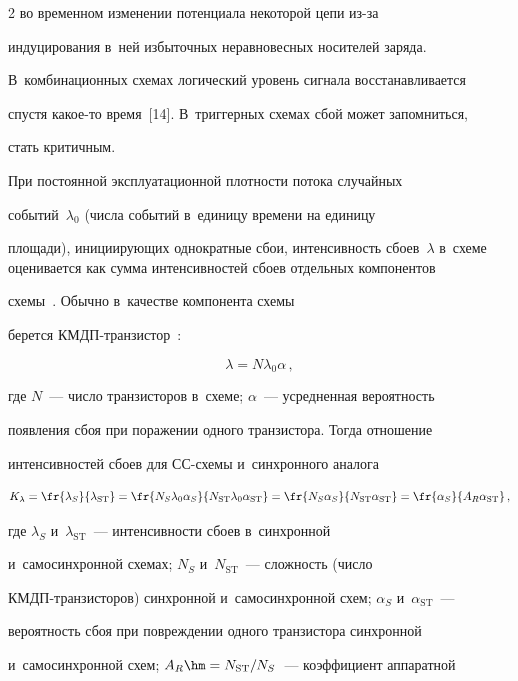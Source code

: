 \begin{multicols}{2}
во временном изменении потенциала некоторой цепи из-за 

индуцирования в~ней избыточных неравновесных носителей заряда. 

В~комбинационных схемах логический уровень сигнала восстанавливается 

спустя ка\-кое-то время~[14]. В~триггерных схемах сбой может запомниться, 

стать критичным. 

  

  При постоянной эксплуатационной плотности потока случайных 

событий~$\lambda_0$ (числа событий в~единицу времени на единицу 

площади), инициирующих однократные сбои, интенсивность сбоев~$\lambda$ в~схеме оценивается как сумма интенсивностей сбоев отдельных компонентов 

схемы~\cite[формула~(3.11)]{13-step}. Обычно в~качестве компонента схемы 

берется КМДП-тран\-зис\-тор~\cite{12-step}:

  $$

  \lambda= N \lambda_0 \alpha\,,

  $$

где $N$~--- число транзисторов в~схеме; $\alpha$~--- усредненная вероятность 

появления сбоя при поражении одного транзистора. Тогда отношение 

интенсивностей сбоев для СС-схе\-мы и~синхронного аналога

$$

K_\lambda= \fr{\lambda_S}{\lambda_{\mathrm{ST}}} =\fr{N_S \lambda_0 \alpha_S}{N_{\mathrm{ST}} 

\lambda_0 \alpha_{\mathrm{ST}}}= \fr{N_S \alpha_S}{N_{\mathrm{ST}} \alpha_{\mathrm{ST}}} =\fr{\alpha_S}{A_R \alpha_{\mathrm{ST}}}\,,

$$

где $\lambda_S$ и~$\lambda_{\mathrm{ST}}$~--- интенсивности сбоев в~синхронной 

и~самосинхронной схе\-мах; $N_S$ и~$N_{\mathrm{ST}}$~--- слож\-ность (чис\-ло  

КМДП-тран\-зис\-то\-ров) синхронной и~самосинхронной схем; $\alpha_S$ и~$\alpha_{\mathrm{ST}}$~--- 

вероятность сбоя при повреждении одного транзистора синхронной  

и~самосинхронной схем; $A_R\hm= N_{\mathrm{ST}}/N_S$~--- коэффициент аппаратной 


\end{multicols}

